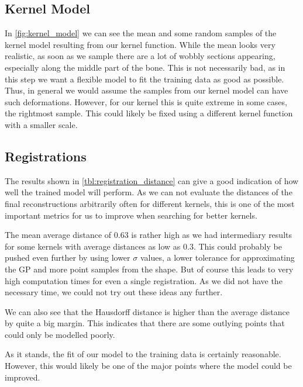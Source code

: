 
\subsection{Kernel Model}
\label{subsec:kernmodeldisc}

In \autoref{fig:kernel_model} we can see the mean and some random samples of the kernel model resulting from our kernel function. 
While the mean looks very realistic, as soon as we sample there are a lot of wobbly sections appearing, especially along the middle part of the bone. 
This is not necessarily bad, as in this step we want a flexible model to fit the training data as good as possible.
Thus, in general we would assume the samples from our kernel model can have such deformations.
However, for our kernel this is quite extreme in some cases, \eg the rightmost sample.
This could likely be fixed using a different kernel function with a smaller scale.


\subsection{Registrations}
\label{subsec:registrresultsdisc}
The results shown in \autoref{tbl:registration_distance} can give a good indication of how well the trained model will perform.
As we can not evaluate the distances of the final reconstructions arbitrarily often for different kernels, this is one of the most important metrics for us to improve when searching for better kernels.

The mean average distance of $0.63$ is rather high as we had intermediary results for some kernels with average distances as low as $0.3$. 
This could probably be pushed even further by using lower $\sigma$ values, a lower tolerance for approximating the GP and more point samples from the shape. 
But of course this leads to very high computation times for even a single registration.
As we did not have the necessary time, we could not try out these ideas any further.

We can also see that the Hausdorff distance is higher than the average distance by quite a big margin. This indicates that there are some outlying points that could only be modelled poorly.

As it stands, the fit of our model to the training data is certainly reasonable.
However, this would likely be one of the major points where the model could be improved.

